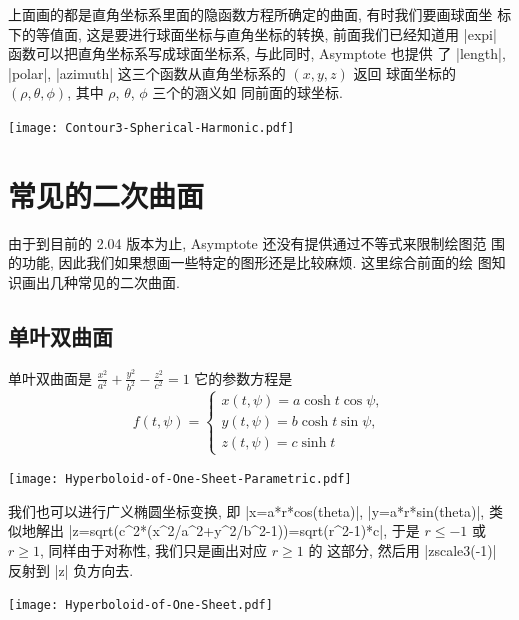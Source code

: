 \documentclass[nofonts,CJKnormalspaces]{ctexbook}[2009/05/20]
\let\leq\leqslant
\let\geq\geqslant
\begin{document}
上面画的都是直角坐标系里面的隐函数方程所确定的曲面, 有时我们要画球面坐
标下的等值面, 这是要进行球面坐标与直角坐标的转换, 前面我们已经知道用
|expi| 函数可以把直角坐标系写成球面坐标系, 与此同时, Asymptote 也提供
了 |length|, |polar|, |azimuth| 这三个函数从直角坐标系的 $(x,y,z)$ 返回
球面坐标的 $(\rho,\theta,\phi)$, 其中 $\rho$, $\theta$, $\phi$ 三个的涵义如
同前面的球坐标.
\begin{center}\texttt{[image: Contour3-Spherical-Harmonic.pdf]}\end{center}%


\section{常见的二次曲面}
由于到目前的 2.04 版本为止, Asymptote 还没有提供通过不等式来限制绘图范
围的功能, 因此我们如果想画一些特定的图形还是比较麻烦. 这里综合前面的绘
图知识画出几种常见的二次曲面.


\subsection{单叶双曲面}
单叶双曲面是
$\frac{x^{2}}{a^{2}}+\frac{y^{2}}{b^{2}}-\frac{z^{2}}{c^{2}}=1$
它的参数方程是
\begin{equation}
  f(t,\psi)=\left\{
    \begin{array}{ll}
      x(t,\psi)=a\cosh t\cos\psi,\\
      y(t,\psi)=b\cosh t\sin\psi,\\
      z(t,\psi)=c\sinh t
    \end{array}\right.
\end{equation}
\begin{center}\texttt{[image: Hyperboloid-of-One-Sheet-Parametric.pdf]}\end{center}%

我们也可以进行广义椭圆坐标变换, 即 |x=a*r*cos(theta)|, |y=a*r*sin(theta)|,
类似地解出
|z=sqrt(c^2*(x^2/a^2+y^2/b^2-1))=sqrt(r^2-1)*c|, 于是
$r\leq -1$ 或 $r\geq 1$, 同样由于对称性, 我们只是画出对应 $r\geq 1$ 的
这部分, 然后用 |zscale3(-1)| 反射到 |z| 负方向去.
\begin{center}\texttt{[image: Hyperboloid-of-One-Sheet.pdf]}\end{center}%

\end{document}
